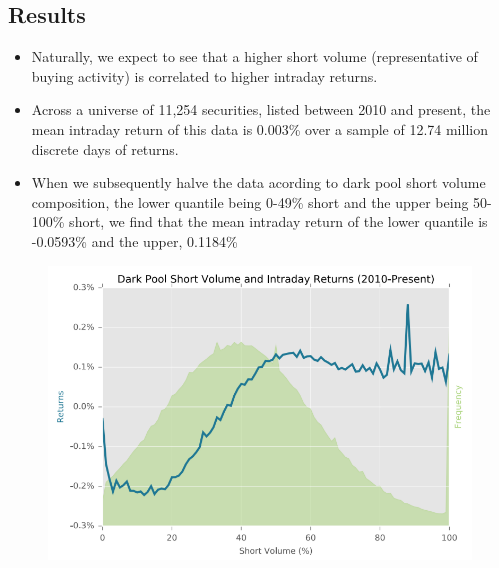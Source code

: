 \documentclass[12pt, oneside]{article}
\begin{document}
\subsection{Results}
\begin{itemize}
    \item Naturally, we expect to see that a higher short volume (representative of buying activity) is correlated to higher intraday returns. 
    \item Across a universe of 11,254 securities, listed between 2010 and present, the mean intraday return of this data is 0.003\% over a sample of 12.74 million discrete days of returns.
    \item When we subsequently halve the data acording to dark pool short volume composition, the lower quantile being 0-49\% short and the upper being 50-100\% short, we find that the mean intraday return of the lower quantile is -0.0593\% and the upper, 0.1184\%
\end{itemize}
 \begin{figure}[!ht]
    \centering
    \includegraphics[width=\textwidth]{Dark Pool Short Volume and Intraday Returns (2010-Present).png}        
\end{figure}
\end{document}
